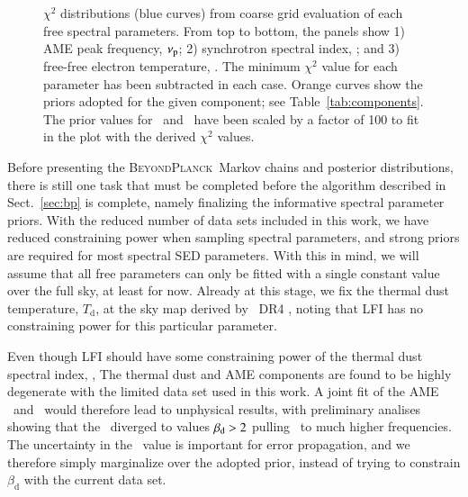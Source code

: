 \documentclass[twocolumn]{aa}
\newcommand{\BP}{\textsc{BeyondPlanck}}
\begin{document}
\begin{figure}
  \caption{$\chi^2$ distributions (blue curves) from coarse grid
    evaluation of each free spectral parameters. From top to bottom,
    the panels show 1) AME peak frequency, $\nup$; 2) synchrotron
    spectral index, \bsynch;
    and 3) free-free electron temperature,
    \Te. The minimum ${\chi}^2$ value for each parameter has been
    subtracted in each case. Orange curves show the priors adopted for
    the given component; see Table~\ref{tab:components}. The prior values for
    \bsynch\ and \nup\ have been scaled by a factor of 100
    to fit in the plot with the derived ${\chi}^2$ values.  }
  \label{fig:spec_param_test}
\end{figure}


Before presenting the \BP\ Markov chains and posterior distributions,
there is still one task that must be completed before the algorithm
described in Sect.~\ref{sec:bp} is complete, namely finalizing the
informative spectral parameter priors. With the reduced number of data
sets included in this work, we have reduced constraining power when
sampling spectral parameters, and strong priors are required for most
spectral SED parameters. With this in mind, we will assume that all
free parameters can only be fitted with a single constant value over
the full sky, at least for now. Already at this stage, we fix the
thermal dust temperature, $T_{\mathrm{d}}$, at the sky map derived by
\Planck\ DR4 \citep{npipe}, noting that LFI has no constraining power
for this particular parameter.

Even though LFI should have some constraining power of the thermal dust
spectral index, \bdust, The thermal dust and AME components are
found to be highly degenerate with the limited data set used in this
work. A joint fit of the AME \nup\ and \bdust\ would therefore lead to
unphysical results, with preliminary analises showing that the
\bdust\ diverged to values $\bdust > 2$ pulling \nup\ to much higher
frequencies. The uncertainty in the \bdust\ value is important for error
propagation, and we therefore simply marginalize over the adopted prior,
instead of trying to constrain $\beta_{\mathrm{d}}$ with the current data set.
\end{document}
